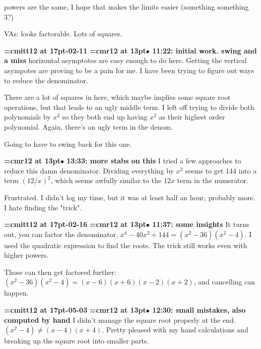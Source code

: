 powers are the same, I hope that makes the limits easier (something something 3?)
\par

VAs:  looks factorable. Lots of squares.
\par

{\medskip\noindent\bf\font\titlefont=cmitt12 at 17pt-02-11}\medskip
{\smallskip\noindent\bf\font\titlefont=cmr12 at 13pt\titlefont $\bullet$ 11:22: initial work. swing and a miss}\smallskip
horizontal asymptotes are easy enough to do here. Getting the vertical asympotes are proving to be a pain for me. I have been trying to figure out ways to reduce the denominator.
\par

There are a lot of squares in here, which maybe implies some square root operations, but that leads to an ugly middle term. I left off trying to divide both polynomials by $x^2$ so they both end up having $x^2$ as their highest order polynomial. Again, there's an ugly term in the denom.
\par

Going to have to swing back for this one.
\par

{\smallskip\noindent\bf\font\titlefont=cmr12 at 13pt\titlefont $\bullet$ 13:33: more stabs on this}\smallskip
I tried a few approaches to reduce this damn denominator. Dividing everything by $x^2$ seems to get 144 into a term $(12/x)^2$, which seems awfully similar to the $12x$ term in the numerator.
\par

Frustrated. I didn't log my time, but it was at least half an hour, probably more. I hate finding the "trick".
\par

{\medskip\noindent\bf\font\titlefont=cmitt12 at 17pt-02-16}\medskip
{\smallskip\noindent\bf\font\titlefont=cmr12 at 13pt\titlefont $\bullet$ 11:37: some insights}\smallskip
It turns out, you can factor the denominator. $x^4 - 40x^2 + 144 = (x^2 - 36)(x^2 -4)$. I used the quadratic expression to find the roots. The trick still works even with higher powers.
\par

Those can then get factored further: $(x^2 - 36)(x^2 -4) = (x - 6)(x+6)(x-2)(x+2)$, and cancelling can happen.
\par

{\medskip\noindent\bf\font\titlefont=cmitt12 at 17pt-05-03}\medskip
{\smallskip\noindent\bf\font\titlefont=cmr12 at 13pt\titlefont $\bullet$ 12:30: small mistakes, also computed by hand}\smallskip
I didn't manage the square root properly at the end. $(x^2-4) \ne (x -4)(x+4)$. Pretty pleased with my hand calculations and breaking up the square root into smaller parts.
\par

